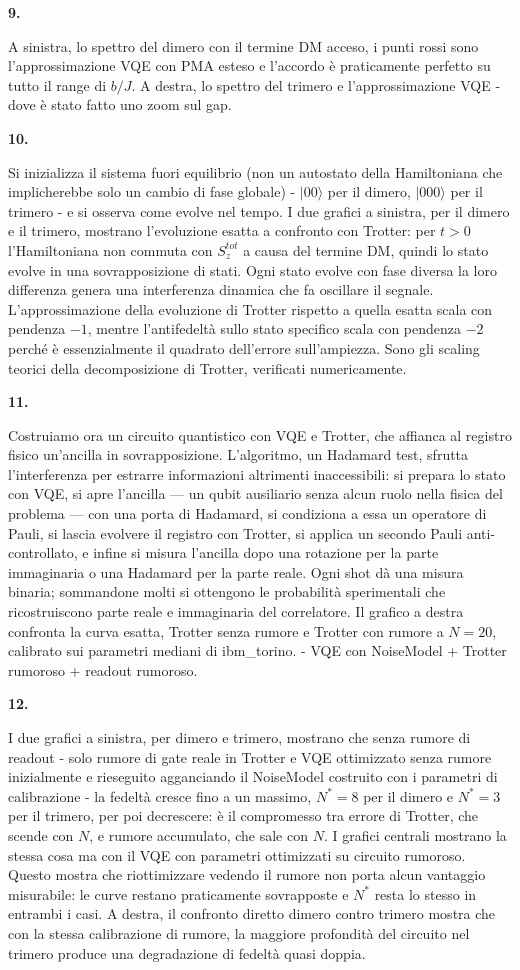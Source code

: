 \documentclass[12pt,a4paper]{article}
\newcommand{\slidenum}[1]{%
  \par\vspace{0.55cm}
  {\bfseries\large #1.}\quad
}
\begin{document}
\slidenum{9}
A sinistra, lo spettro del dimero con il termine DM acceso, i punti rossi sono l'approssimazione VQE con PMA esteso e l'accordo è praticamente perfetto su tutto il range di $b/J$. A destra, lo spettro del trimero e l'approssimazione VQE - dove è stato fatto uno zoom sul gap.

\slidenum{10}
Si inizializza il sistema fuori equilibrio (non un autostato della Hamiltoniana che implicherebbe solo un cambio di fase globale) - $|00\rangle$ per il dimero, $|000\rangle$ per il trimero - e si osserva come evolve nel tempo. I due grafici a sinistra, per il dimero e il trimero, mostrano l'evoluzione esatta a confronto con Trotter: per $t > 0$ l'Hamiltoniana non commuta con $S_z^{tot}$ a causa del termine DM, quindi lo stato evolve in una sovrapposizione di stati. Ogni stato evolve con fase diversa la loro differenza genera una interferenza dinamica che fa oscillare il segnale. L'approssimazione della evoluzione di Trotter rispetto a quella esatta scala con pendenza $-1$, mentre l'antifedeltà sullo stato specifico scala con pendenza $-2$ perché è essenzialmente il quadrato dell'errore sull'ampiezza. Sono gli scaling teorici della decomposizione di Trotter, verificati numericamente.

\slidenum{11}
Costruiamo ora un circuito quantistico con VQE e Trotter, che affianca al registro fisico un'ancilla in sovrapposizione. L'algoritmo, un Hadamard test, sfrutta l'interferenza per estrarre informazioni altrimenti inaccessibili: si prepara lo stato con VQE, si apre l'ancilla --- un qubit ausiliario senza alcun ruolo nella fisica del problema --- con una porta di Hadamard, si condiziona a essa un operatore di Pauli, si lascia evolvere il registro con Trotter, si applica un secondo Pauli anti-controllato, e infine si misura l'ancilla dopo una rotazione per la parte immaginaria o una Hadamard per la parte reale. Ogni shot dà una misura binaria; sommandone molti si ottengono le probabilità sperimentali che ricostruiscono parte reale e immaginaria del correlatore. Il grafico a destra confronta la curva esatta, Trotter senza rumore e Trotter con rumore a $N=20$, calibrato sui parametri mediani di ibm\_torino. - VQE con NoiseModel + Trotter rumoroso + readout rumoroso.

\slidenum{12}
I due grafici a sinistra, per dimero e trimero, mostrano che senza rumore di readout - solo rumore di gate reale in Trotter e VQE ottimizzato senza rumore inizialmente e rieseguito agganciando il NoiseModel costruito con i parametri di calibrazione - la fedeltà cresce fino a un massimo, $N^* = 8$ per il dimero e $N^* = 3$ per il trimero, per poi decrescere: è il compromesso tra errore di Trotter, che scende con $N$, e rumore accumulato, che sale con $N$. I grafici centrali mostrano la stessa cosa ma con il VQE con parametri ottimizzati su circuito rumoroso. Questo mostra che riottimizzare vedendo il rumore non porta alcun vantaggio misurabile: le curve restano praticamente sovrapposte e $N^*$ resta lo stesso in entrambi i casi. A destra, il confronto diretto dimero contro trimero mostra che con la stessa calibrazione di rumore, la maggiore profondità del circuito nel trimero produce una degradazione di fedeltà quasi doppia.
\end{document}
